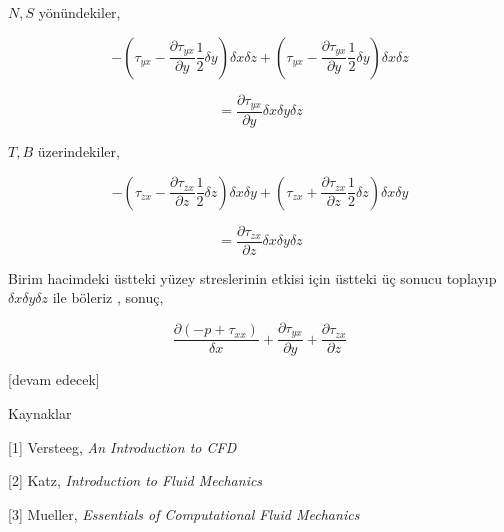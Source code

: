 \documentclass[12pt,fleqn]{article}\usepackage{../../common}
\begin{document}
$N,S$ yönündekiler,

$$
- \left( \tau_{yx} - \frac{\partial \tau_{yx}}{\partial y}  \frac{1}{2} \delta y
\right) \delta x \delta z  +
\left( \tau_{yx} - \frac{\partial \tau_{yx}}{\partial y}  \frac{1}{2} \delta y
\right) \delta x \delta z  
$$

$$
= \frac{\partial \tau_{yx}}{\partial y} \delta x \delta y \delta z 
$$

$T,B$ üzerindekiler,

$$
- \left(
\tau_{zx} - \frac{\partial \tau_{zx}}{\partial z} \frac{1}{2} \delta z
\right) \delta x \delta y +
\left(
\tau_{zx} + \frac{\partial \tau_{zx}}{\partial z} \frac{1}{2} \delta z
\right) \delta x \delta y 
$$

$$
= \frac{\partial \tau_{zx}}{\partial z} \delta x \delta y \delta z 
$$

Birim hacimdeki üstteki yüzey streslerinin etkisi için üstteki üç sonucu
toplayıp $\delta x \delta y \delta z $ ile böleriz , sonuç,

$$
\frac{\partial (-p + \tau_{xx})}{\delta x} +
\frac{\partial \tau_{yx}}{\partial y} +
\frac{\partial \tau_{zx}}{\partial z} 
$$




[devam edecek]

Kaynaklar

[1] Versteeg, {\em An Introduction to CFD}

[2] Katz, {\em Introduction to Fluid Mechanics}

[3] Mueller, {\em Essentials of Computational Fluid Mechanics}
\end{document}
